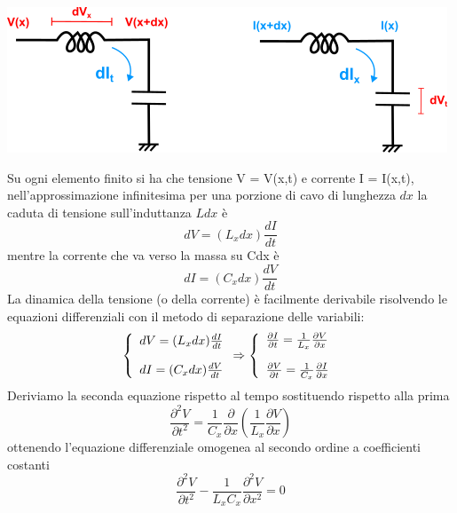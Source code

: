 \begin{center}
	\includegraphics[width = 11 cm]{images/current}
\end{center}
Su ogni elemento finito si ha che tensione V = V(x,t) e corrente I = I(x,t), nell'approssimazione infinitesima per una porzione di cavo di lunghezza $dx$ la caduta di tensione sull'induttanza $Ldx$ \`e 
\begin{equation*}
	dV = (L_x dx) \frac{dI}{dt}
\end{equation*}
mentre la corrente che va verso la massa su Cdx \`e 
\begin{equation*}
	dI = (C_x dx) \frac{dV}{dt}
\end{equation*}
La dinamica della tensione (o della corrente) \`e facilmente derivabile risolvendo le equazioni differenziali con il metodo di separazione delle variabili:
\begin{equation}
\left\{\begin{array} { l } 
{ d V = ( L _ { x } d x ) \frac { d I } { d t } } \\ \rule{0pt}{20pt}
{ d I = ( C _ { x } d x ) \frac { d V } { d t } }
\end{array} \Rightarrow \left\{\begin{array}{l}
\frac{\partial I}{\partial t}=\frac{1}{L_x} \frac{\partial V}{\partial x} \\ \rule{0pt}{20pt}
\frac{\partial V}{\partial t}=\frac{1}{C_x} \frac{\partial I}{\partial x}
\end{array}\right.\right.
\end{equation}
Deriviamo la seconda equazione rispetto al tempo sostituendo rispetto alla prima 
\begin{equation*}
\frac{\partial^2 V}{\partial t^2}=\frac{1}{C_x} \frac{\partial}{\partial x}\left(\frac{1}{L_x} \frac{\partial V}{\partial x}\right)
\end{equation*}
ottenendo l'equazione differenziale omogenea al secondo ordine a coefficienti costanti
\begin{equation}
\frac{\partial^2 V}{\partial t^2}-\frac{1}{L_x C_x} \frac{\partial^2 V}{\partial x^2}=0
\end{equation}
